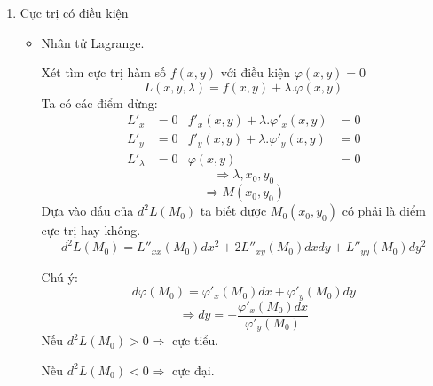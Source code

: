 \documentclass[15pt,a4paper]{report}
\begin{document}
{\begin{center}
\begin{enumerate}
\begin{itemize}
                    Ta xét:
                        \[A = f''_{xx}(x_{0}, y_{0})\]
                        \[B = f''_{xy}(x_{0}, y_{0})\]
                        \[C = f''_{yy}(x_{0}, y_{0})\]
                    \indent Để $M_{0}$ là điểm cực trị của hàm số:
                        \[AC - B^{2} > 0\]
                    Nếu $A > 0$ hoặc $C > 0$ $\Rightarrow$ cực tiểu địa phương.

                    Nếu $A < 0$ hoặc $C < 0$ $\Rightarrow$ cực đại địa phương.
                    
                    Nếu $AC - B^{2} < 0$ $\Rightarrow$ không phải cực trị.

                    Nếu $AC - B^{2} = 0$ $\Rightarrow$ cũng có thể là có, cũng có thể là không.
            
            \end{itemize}
                
        \item Cực trị có điều kiện
            \begin{itemize}
                \item Nhân tử  Lagrange.
                    
                Xét tìm cực trị hàm số $f(x, y)$ với điều kiện $\varphi(x, y) = 0$
                \[L(x, y, \lambda) = f(x, y) + \lambda . \varphi(x, y)\]
                Ta có các điểm dừng:
                \begin{align*}
                L'_{x} &= 0 & f'_{x}(x, y) + \lambda.\varphi'_{x}(x, y) &= 0\\
                L'_{y} &= 0 & f'_{y}(x, y) + \lambda.\varphi'_{y}(x, y) &= 0 \\
                L'_{\lambda} & = 0 & \varphi(x, y) &= 0
            \end{align*}
                \[\Rightarrow \lambda, x_{0}, y_{0}\]
                \[\Rightarrow M(x_{0}, y_{0})\]
                Dựa vào dấu của $d^{2}L(M_{0})$ ta biết được $M_{0}(x_{0}, y_{0})$ có phải là điểm cực trị hay không.
                \[d^{2}L(M_{0}) = L''_{xx}(M_{0})dx^{2} + 2L''_{xy}(M_{0})dxdy + L''_{yy}(M_{0})dy^{2}\]

                Chú ý:
                \[d\varphi(M_{0}) = \varphi'_{x}(M_{0}) dx + \varphi'_{y}(M_{0}) dy\]
                \[\Rightarrow dy = -\dfrac{\varphi'_{x}(M_{0})dx}{\varphi'_{y}(M_{0})}\]
                Nếu $d^{2}L(M_{0}) > 0 \Rightarrow$ cực tiểu.
                
                Nếu $d^{2}L(M_{0}) < 0 \Rightarrow$ cực đại.
                

\end{itemize}
\end{enumerate}
\end{center}}
\end{document}
